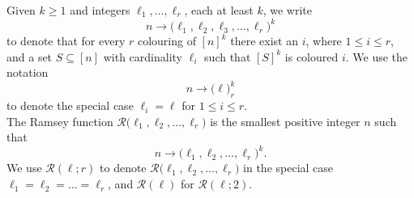 \documentclass[12pt]{report}
\def\R{\mathcal R}
\def\l{\ell}
\begin{document}
\noindent Given $k \ge 1$ and integers ${\l}_1,\ldots,{\l}_r$, each at least $k$, we write 
\[ n \rightarrow \big(\l_{1},\l_{2},\l_{3}, \ldots,\l_{r}\big)^k \] 
to denote that for every $r$ colouring of $[n]^k$ there exist an $i$, where $1 \le i \le r$, and a set $S \subseteq[n]$ with cardinality ${\l}_i$ such that  $[S]^k$ is coloured $i$. We use the notation 
\[ n \rightarrow \big(\l\big)^k_r \]
to denote the special case $\l_i=\l$ for $1 \le i \le r$. \\

\noindent The Ramsey function ${\R}\big(\l_{1},\l_{2}, \ldots ,\l_{r}\big)$ is the smallest positive integer $n$ such that 
\[ n\rightarrow \big(\l_{1},\l_{2}, \ldots ,\l_{r}\big)^k. \]
We use $\R(\l;r)$ to denote $\R \big(\l_{1},\l_{2}, \ldots ,\l_{r} \big)$ in the special case $\l_{1}=\l_{2}=\dots =\l_{r}$, and $\R(\l)$ for $\R(\l;2)$. \\
\end{document}
